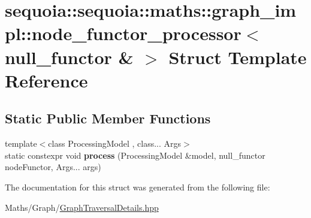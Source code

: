 \hypertarget{structsequoia_1_1sequoia_1_1maths_1_1graph__impl_1_1node__functor__processor_3_01null__functor_01_6_01_4}{}\section{sequoia\+::sequoia\+::maths\+::graph\+\_\+impl\+::node\+\_\+functor\+\_\+processor$<$ null\+\_\+functor \& $>$ Struct Template Reference}
\label{structsequoia_1_1sequoia_1_1maths_1_1graph__impl_1_1node__functor__processor_3_01null__functor_01_6_01_4}
\subsection*{Static Public Member Functions}
\begin{DoxyCompactItemize}
\item 
\mbox{\label{structsequoia_1_1sequoia_1_1maths_1_1graph__impl_1_1node__functor__processor_3_01null__functor_01_6_01_4_a5d4164564636893123d7f06250686a99}} 
{\footnotesize template$<$class Processing\+Model , class... Args$>$ }\\static constexpr void {\bfseries process} (Processing\+Model \&model, null\+\_\+functor node\+Functor, Args... args)
\end{DoxyCompactItemize}


The documentation for this struct was generated from the following file\+:\begin{DoxyCompactItemize}
\item 
Maths/\+Graph/\mbox{\hyperlink{_graph_traversal_details_8hpp}{Graph\+Traversal\+Details.\+hpp}}\end{DoxyCompactItemize}
